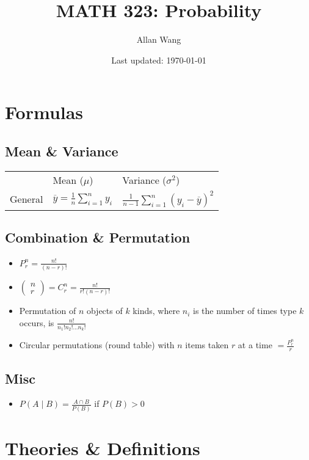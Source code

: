 \documentclass[12pt]{article}
\author{Allan Wang}
\date{Last updated: \today}
\title{MATH 323: Probability}
\newcommand\mm[1]{\begin{pmatrix}#1\end{pmatrix}}
\begin{document}
\onehalfspacing
\maketitle
\tableofcontents
\pagebreak

\section{Formulas}

\subsection{Mean \& Variance}

\begin{tabularx}{\textwidth}{l | X | X}
	& Mean ($\mu$) & Variance ($\sigma^2$) \\
	General & $\overline{y} = \frac{1}{n} \sum_{i = 1}^n y_i$ & $\frac{1}{n - 1} \sum_{i = 1}^n (y_i - \overline{y})^2$
\end{tabularx}

\subsection{Combination \& Permutation}

\begin{itemize}
	\item $P_r^n = \frac{n!}{(n - r)!}$
	\item $\mm{n \\ r} = C_r^n = \frac{n!}{r! (n - r)!}$
	\item Permutation of $n$ objects of $k$ kinds, where $n_i$ is the number of times type $k$ occurs, is $\frac{n!}{n_1! n_2! ... n_k!}$
	\item Circular permutations (round table) with $n$ items taken $r$ at a time $ = \frac{P_r^n}{r}$
\end{itemize}

\subsection{Misc}

\begin{itemize}
	\item $P(A \mid B) = \frac{A \cap B}{P(B)}$ if $P(B) > 0$
\end{itemize}

\section{Theories \& Definitions}
\end{document}
